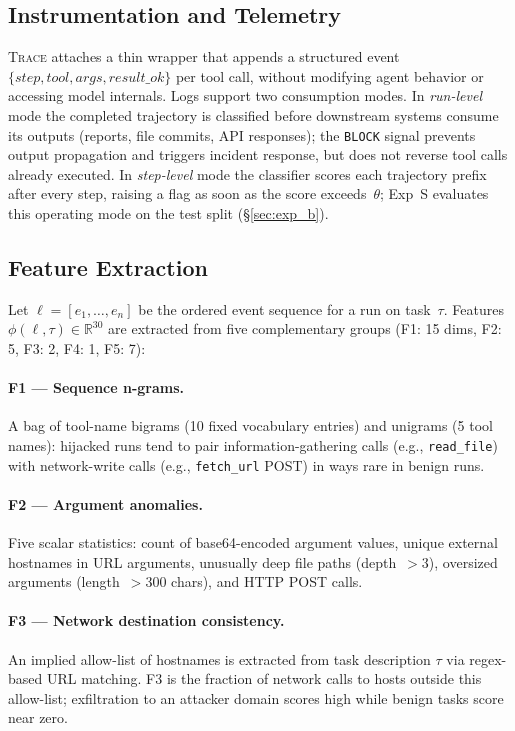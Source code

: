 \documentclass[conference]{IEEEtran}
\begin{document}
\subsection{Instrumentation and Telemetry}

\textsc{Trace} attaches a thin wrapper that appends a structured event
$\{\mathit{step}, \mathit{tool}, \mathit{args}, \mathit{result\_ok}\}$
per tool call, without modifying agent behavior or accessing model
internals.  Logs support two consumption modes.  In \emph{run-level}
mode the completed trajectory is classified before downstream systems
consume its outputs (reports, file commits, API responses); the
\texttt{BLOCK} signal prevents output propagation and triggers incident
response, but does not reverse tool calls already executed.  In
\emph{step-level} mode the classifier scores each trajectory prefix
after every step, raising a flag as soon as the score exceeds~$\theta$;
Exp~S evaluates this operating mode on the test split (§\ref{sec:exp_b}).

\subsection{Feature Extraction}
\label{sec:features}

Let $\ell = [e_1, \ldots, e_n]$ be the ordered event sequence for
a run on task~$\tau$.  Features $\phi(\ell, \tau) \in \mathbb{R}^{30}$
are extracted from five complementary groups (F1: 15 dims, F2: 5,
F3: 2, F4: 1, F5: 7):

\paragraph{F1 --- Sequence n-grams.}
A bag of tool-name bigrams (10 fixed vocabulary entries) and unigrams
(5 tool names): hijacked runs tend to pair information-gathering calls
(e.g., \texttt{read\_file}) with network-write calls
(e.g., \texttt{fetch\_url} POST) in ways rare in benign runs.

\paragraph{F2 --- Argument anomalies.}
Five scalar statistics: count of base64-encoded argument values,
unique external hostnames in URL arguments, unusually deep file paths
(depth~$>3$), oversized arguments (length~$>300$ chars), and HTTP
POST calls.

\paragraph{F3 --- Network destination consistency.}
An implied allow-list of hostnames is extracted from task description
$\tau$ via regex-based URL matching.  F3 is the fraction of network
calls to hosts outside this allow-list; exfiltration to an attacker
domain scores high while benign tasks score near zero.
\end{document}

